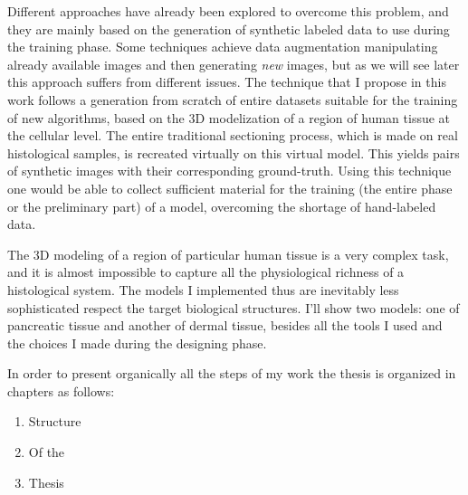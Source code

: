 Different approaches have already been explored to overcome this problem, and they are mainly based on the generation of synthetic labeled data to use during the training phase. Some techniques achieve data augmentation manipulating already available images and then generating \textit{new} images, but as we will see later this approach suffers from different issues. The technique that I propose in this work follows a generation from scratch of entire datasets suitable for the training of new algorithms, based on the 3D modelization of a region of human tissue at the cellular level. The entire traditional sectioning process, which is made on real histological samples, is recreated virtually on this virtual model. This yields pairs of synthetic images with their corresponding ground-truth. Using this technique one would be able to collect sufficient material for the training (the entire phase or the preliminary part) of a model, overcoming the shortage of hand-labeled data.

The 3D modeling of a region of particular human tissue is a very complex task, and it is almost impossible to capture all the physiological richness of a histological system. The models I implemented thus are inevitably less sophisticated respect the target biological structures. I'll show two models: one of pancreatic tissue and another of dermal tissue, besides all the tools I used and the choices I made during the designing phase.

In order to present organically all the steps of my work the thesis is organized in chapters as follows:

\begin{enumerate}
    \item Structure

    \item Of the

    \item Thesis
\end{enumerate}



\clearpage
